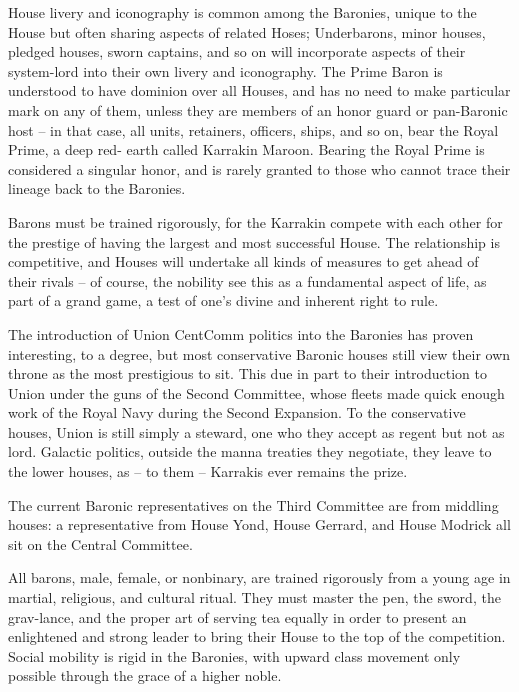 House livery and iconography is common among the Baronies, unique to the House but often
sharing aspects of related Hoses; Underbarons, minor houses, pledged houses, sworn captains,
and so on will incorporate aspects of their system-lord into their own livery and iconography. The
Prime Baron is understood to have dominion over all Houses, and has no need to make
particular mark on any of them, unless they are members of an honor guard or pan-Baronic host
-- in that case, all units, retainers, officers, ships, and so on, bear the Royal Prime, a deep red-
earth called Karrakin Maroon. Bearing the Royal Prime is considered a singular honor, and is
rarely granted to those who cannot trace their lineage back to the Baronies.

Barons must be trained rigorously, for the Karrakin compete with each other for the prestige of
having the largest and most successful House. The relationship is competitive, and Houses will
undertake all kinds of measures to get ahead of their rivals -- of course, the nobility see this as a
fundamental aspect of life, as part of a grand game, a test of one’s divine and inherent right to
rule.

The introduction of Union CentComm politics into the Baronies has proven interesting, to a
degree, but most conservative Baronic houses still view their own throne as the most prestigious
to sit. This due in part to their introduction to Union under the guns of the Second Committee,
whose fleets made quick enough work of the Royal Navy during the Second Expansion. To the
conservative houses, Union is still simply a steward, one who they accept as regent but not as
lord. Galactic politics, outside the manna treaties they negotiate, they leave to the lower houses,
as -- to them -- Karrakis ever remains the prize.

The current Baronic representatives on the Third Committee are from middling houses: a
representative from House Yond, House Gerrard, and House Modrick all sit on the Central
Committee.

All barons, male, female, or nonbinary, are trained rigorously from a young age in martial,
religious, and cultural ritual. They must master the pen, the sword, the grav-lance, and the proper
art of serving tea equally in order to present an enlightened and strong leader to bring their
House to the top of the competition. Social mobility is rigid in the Baronies, with upward class
movement only possible through the grace of a higher noble.

